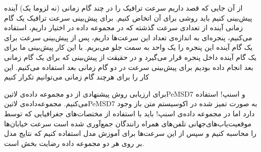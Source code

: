 از آن جایی که قصد داریم سرعت ترافیک را در چند گام زمانی (نه لزوما یک) آینده پیش‌بینی کنیم باید روشی برای آن اتخاض کنیم. برای پیش‌بینی سرعت ترافیک یک گام زمانی آینده از تعدادی سرعت گذشته که در مجموعه داده در اختیار داریم، استفاده می‌کنیم، پنجره‌ای به اندازه‌ی تعداد این سرعت‌ها داریم، پس از پیش‌بینی سرعت برای یک گام آینده این پنجره را یک واحد به سمت جلو می‌بریم. با این کار پیش‌بینی ما برای یک گام آینده داخل پنجره قرار می‌گیرد و در حقیقت از پیش‌بینی که برای یک گام زمانی بعد انجام داده بودیم برای پیش‌بینی سرعت در دو گام زمانی بعد استفاده می‌کنیم. این کار را برای هرچند گام زمانی می‌توانیم تکرار کنیم

برای ارزیابی روش پیشنهادی از دو مجموعه داده‌ی ‌لاتین{PeMSD7} و اسنپ! استفاده می‌کنیم. مجموعه‌داده‌ی ‌لاتین{PeMSD7} به صورت تمیز شده در اکوسیستم متن باز وجود دارد اما در مجموعه داده‌ی اسنپ! باید با استفاده از مختصات‌های جغرافیایی که توسط موقعیت‌یاب‌های‌جهانی تلفن‌های همراه رانندگان جمع‌آوری شده است سرعت خیابان‌ها را محاسبه کنیم و سپس از این سرعت‌ها برای آموزش مدل استفاده کنیم که نتایج مدل بر روی هر دو مجموعه داده رضایت بخش است.
